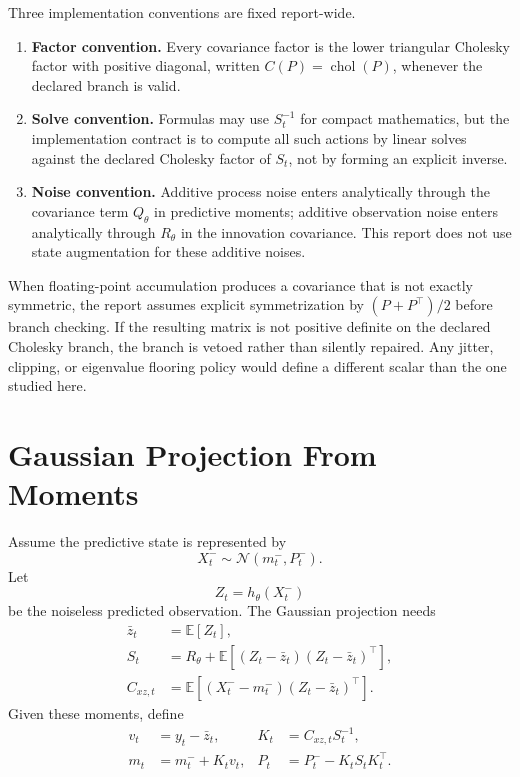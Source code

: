 \documentclass[11pt]{article}
\numberwithin{equation}{section}
\newcommand{\E}{\mathbb E}
\newcommand{\N}{\mathcal N}
\newcommand{\chol}{\operatorname{chol}}
\begin{document}
Three implementation conventions are fixed report-wide.
\begin{enumerate}[leftmargin=0.28in]
  \item \textbf{Factor convention.}  Every covariance factor is the lower
  triangular Cholesky factor with positive diagonal, written
  \(C(P)=\chol(P)\), whenever the declared branch is valid.
  \item \textbf{Solve convention.}  Formulas may use \(S_t^{-1}\) for compact
  mathematics, but the implementation contract is to compute all such actions by
  linear solves against the declared Cholesky factor of \(S_t\), not by forming
  an explicit inverse.
  \item \textbf{Noise convention.}  Additive process noise enters analytically
  through the covariance term \(Q_\theta\) in predictive moments; additive
  observation noise enters analytically through \(R_\theta\) in the innovation
  covariance.  This report does not use state augmentation for these additive
  noises.
\end{enumerate}

When floating-point accumulation produces a covariance that is not exactly
symmetric, the report assumes explicit symmetrization by
\((P+P^\top)/2\) before branch checking.  If the resulting matrix is not
positive definite on the declared Cholesky branch, the branch is vetoed rather
than silently repaired.  Any jitter, clipping, or eigenvalue flooring policy
would define a different scalar than the one studied here.

\section{Gaussian Projection From Moments}
\label{sec:p31-gaussian-projection}

Assume the predictive state is represented by
\begin{equation}
  X_t^-\sim\N(m_t^-,P_t^-).
  \label{eq:p31-predictive-gaussian}
\end{equation}
Let
\begin{equation}
  Z_t=h_\theta(X_t^-)
  \label{eq:p31-predicted-observation}
\end{equation}
be the noiseless predicted observation.  The Gaussian projection needs
\begin{align}
  \bar z_t &= \E[Z_t],
  \label{eq:p31-zbar}\\
  S_t &= R_\theta+\E[(Z_t-\bar z_t)(Z_t-\bar z_t)^\top],
  \label{eq:p31-S}\\
  C_{xz,t}&=\E[(X_t^- -m_t^-)(Z_t-\bar z_t)^\top].
  \label{eq:p31-Cxz}
\end{align}
Given these moments, define
\begin{align}
  v_t&=y_t-\bar z_t,
  &
  K_t&=C_{xz,t}S_t^{-1},
  \label{eq:p31-v-K}\\
  m_t&=m_t^-+K_tv_t,
  &
  P_t&=P_t^- - K_tS_tK_t^\top.
  \label{eq:p31-projection-update}
\end{align}
\end{document}
